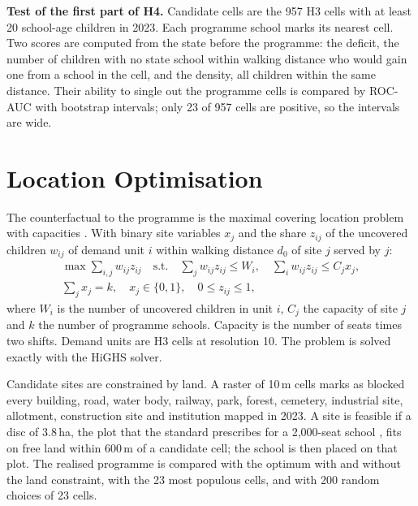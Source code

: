 \textbf{Test of the first part of H4.} Candidate cells are the 957 H3 cells with at least 20 school-age children in 2023. Each programme school marks its nearest cell. Two scores are computed from the state before the programme: the deficit, the number of children with no state school within walking distance who would gain one from a school in the cell, and the density, all children within the same distance. Their ability to single out the programme cells is compared by ROC-AUC with bootstrap intervals; only 23 of 957 cells are positive, so the intervals are wide.

\section{Location Optimisation}
\label{sec:optimisation-methods}

The counterfactual to the programme is the maximal covering location problem \cite{church1974, murray2016} with capacities \cite{current1988}. With binary site variables $x_j$ and the share $z_{ij}$ of the uncovered children $w_{ij}$ of demand unit $i$ within walking distance $d_0$ of site $j$ served by $j$:
\begin{equation}
\begin{gathered}
\max \sum_{i,j} w_{ij} z_{ij} \quad \text{s.t.} \quad
\sum_j w_{ij} z_{ij} \le W_i, \quad
\sum_i w_{ij} z_{ij} \le C_j x_j, \\
\sum_j x_j = k, \quad
x_j \in \{0,1\}, \quad 0 \le z_{ij} \le 1,
\end{gathered}
\label{eq:mclp}
\end{equation}
where $W_i$ is the number of uncovered children in unit $i$, $C_j$ the capacity of site $j$ and $k$ the number of programme schools. Capacity is the number of seats times two shifts. Demand units are H3 cells at resolution 10. The problem is solved exactly with the HiGHS solver.

Candidate sites are constrained by land. A raster of 10\,m cells marks as blocked every building, road, water body, railway, park, forest, cemetery, industrial site, allotment, construction site and institution mapped in 2023. A site is feasible if a disc of 3.8\,ha, the plot that the standard prescribes for a 2,000-seat school \cite{sprk2013}, fits on free land within 600\,m of a candidate cell; the school is then placed on that plot. The realised programme is compared with the optimum with and without the land constraint, with the 23 most populous cells, and with 200 random choices of 23 cells.

